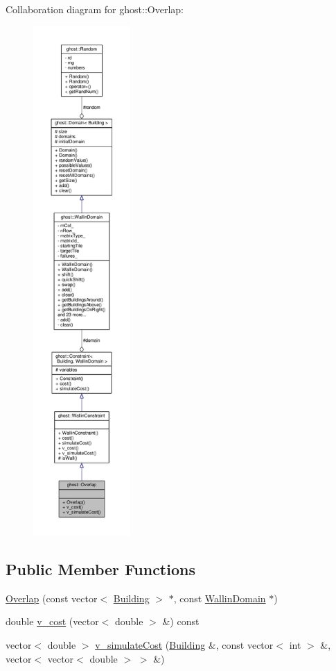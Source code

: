 Collaboration diagram for ghost\-:\-:Overlap\-:\nopagebreak
\begin{figure}[H]
\begin{center}
\leavevmode
\includegraphics[height=550pt]{classghost_1_1Overlap__coll__graph}
\end{center}
\end{figure}
\subsection*{Public Member Functions}
\begin{DoxyCompactItemize}
\item 
\hyperlink{classghost_1_1Overlap_a256dfd7655e1937ed0d13368527e9eec}{Overlap} (const vector$<$ \hyperlink{classghost_1_1Building}{Building} $>$ $\ast$, const \hyperlink{classghost_1_1WallinDomain}{Wallin\-Domain} $\ast$)
\item 
double \hyperlink{classghost_1_1Overlap_a7a926991f06c785126e5d7995953e493}{v\-\_\-cost} (vector$<$ double $>$ \&) const 
\item 
vector$<$ double $>$ \hyperlink{classghost_1_1Overlap_a7e8a90ef1adf8e9478e78b84ce5abd70}{v\-\_\-simulate\-Cost} (\hyperlink{classghost_1_1Building}{Building} \&, const vector$<$ int $>$ \&, vector$<$ vector$<$ double $>$ $>$ \&)
\end{DoxyCompactItemize}
